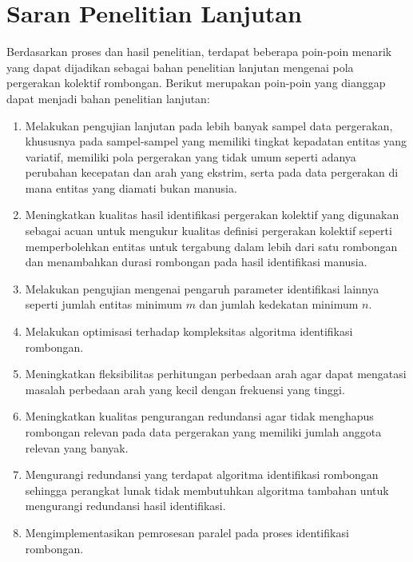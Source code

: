 \section{Saran Penelitian Lanjutan}
\label{sec:saran}

Berdasarkan proses dan hasil penelitian, terdapat beberapa poin-poin menarik yang dapat dijadikan sebagai bahan penelitian lanjutan mengenai pola pergerakan kolektif rombongan. Berikut merupakan poin-poin yang dianggap dapat menjadi bahan penelitian lanjutan:

\begin{enumerate}
    \item Melakukan pengujian lanjutan pada lebih banyak sampel data pergerakan, khususnya pada sampel-sampel yang memiliki tingkat kepadatan entitas yang variatif, memiliki pola pergerakan yang tidak umum seperti adanya perubahan kecepatan dan arah yang ekstrim, serta pada data pergerakan di mana entitas yang diamati bukan manusia.
    \item Meningkatkan kualitas hasil identifikasi pergerakan kolektif yang digunakan sebagai acuan untuk mengukur kualitas definisi pergerakan kolektif seperti memperbolehkan entitas untuk tergabung dalam lebih dari satu rombongan dan menambahkan durasi rombongan pada hasil identifikasi manusia.
    \item Melakukan pengujian mengenai pengaruh parameter identifikasi lainnya seperti jumlah entitas minimum $m$ dan jumlah kedekatan minimum $n$.
    \item Melakukan optimisasi terhadap kompleksitas algoritma identifikasi rombongan.
    \item Meningkatkan fleksibilitas perhitungan perbedaan arah agar dapat mengatasi masalah perbedaan arah yang kecil dengan frekuensi yang tinggi.
    \item Meningkatkan kualitas pengurangan redundansi agar tidak menghapus rombongan relevan pada data pergerakan yang memiliki jumlah anggota relevan yang banyak.
    \item Mengurangi redundansi yang terdapat algoritma identifikasi rombongan sehingga perangkat lunak tidak membutuhkan algoritma tambahan untuk mengurangi redundansi hasil identifikasi.
    \item Mengimplementasikan pemrosesan paralel pada proses identifikasi rombongan.
\end{enumerate}